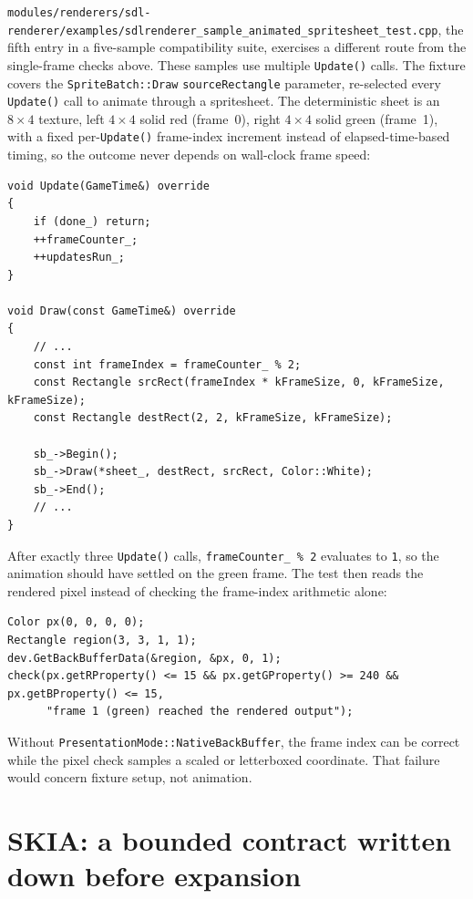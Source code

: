 \texttt{modules/renderers/sdl-renderer/examples/\allowbreak{}sdlrenderer\_sample\_animated\_spritesheet\_test.cpp},
the fifth entry in a five-sample compatibility suite, exercises a different route from the
single-frame checks above. These samples use multiple \texttt{Update()} calls. The fixture covers
the \texttt{SpriteBatch::Draw} \texttt{sourceRectangle} parameter, re-selected every
\texttt{Update()} call to animate through a spritesheet. The deterministic sheet is an
$8\times4$ texture, left $4\times4$ solid red (frame~0), right $4\times4$ solid green
(frame~1), with a fixed per-\texttt{Update()} frame-index increment instead of
elapsed-time-based timing, so the outcome never depends on wall-clock frame speed:

\begin{lstlisting}
void Update(GameTime&) override
{
    if (done_) return;
    ++frameCounter_;
    ++updatesRun_;
}

void Draw(const GameTime&) override
{
    // ...
    const int frameIndex = frameCounter_ % 2;
    const Rectangle srcRect(frameIndex * kFrameSize, 0, kFrameSize, kFrameSize);
    const Rectangle destRect(2, 2, kFrameSize, kFrameSize);

    sb_->Begin();
    sb_->Draw(*sheet_, destRect, srcRect, Color::White);
    sb_->End();
    // ...
}
\end{lstlisting}

After exactly three \texttt{Update()} calls, \texttt{frameCounter\_ \% 2} evaluates to
\texttt{1}, so the animation should have settled on the green frame. The test then reads the
rendered pixel instead of checking the frame-index arithmetic alone:

\begin{lstlisting}
Color px(0, 0, 0, 0);
Rectangle region(3, 3, 1, 1);
dev.GetBackBufferData(&region, &px, 0, 1);
check(px.getRProperty() <= 15 && px.getGProperty() >= 240 && px.getBProperty() <= 15,
      "frame 1 (green) reached the rendered output");
\end{lstlisting}

Without \texttt{PresentationMode::NativeBackBuffer}, the frame index can be correct while the
pixel check samples a scaled or letterboxed coordinate. That failure would concern fixture
setup, not animation.

\section{SKIA: a bounded contract written down before expansion}

